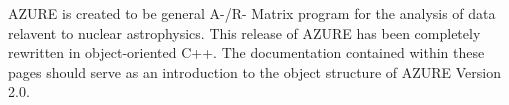 AZURE is created to be general A-/R- Matrix program for the analysis of data relavent to nuclear astrophysics. This release of AZURE has been completely rewritten in object-oriented C++. The documentation contained within these pages should serve as an introduction to the object structure of AZURE Version 2.0. 